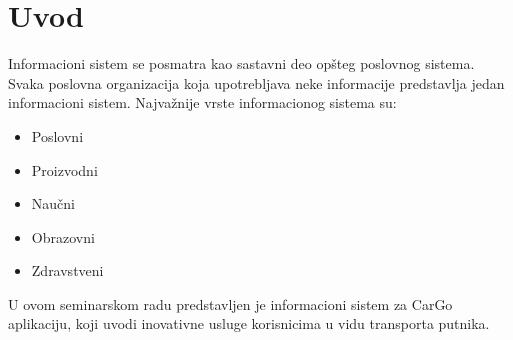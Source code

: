 \section{\bfseries Uvod}
\par Informacioni sistem se posmatra kao sastavni deo opšteg poslovnog sistema. Svaka poslovna organizacija koja upotrebljava neke informacije predstavlja jedan informacioni sistem. Najvažnije vrste informacionog sistema su: 
\begin{itemize}
	\item Poslovni
	\item Proizvodni
	\item Naučni
	\item Obrazovni
	\item Zdravstveni
\end{itemize}
U ovom seminarskom radu predstavljen je informacioni sistem za CarGo aplikaciju, koji uvodi inovativne usluge korisnicima u vidu transporta putnika.
